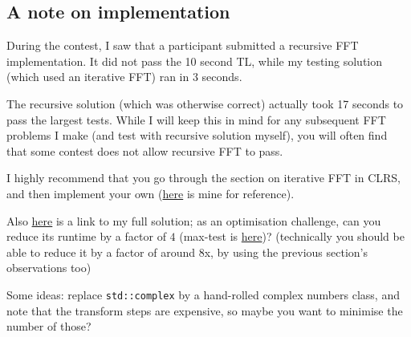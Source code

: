 	\subsection{A note on implementation}
		During the contest, I saw that a participant submitted a recursive FFT implementation.
		It did not pass the 10 second TL, while my testing solution (which used an iterative FFT)
		ran in 3 seconds.

		The recursive solution (which was otherwise correct) actually took 17 seconds to pass the
		largest tests. While I will keep this in mind for any subsequent FFT problems I make
		(and test with recursive solution myself), you will often find that some contest does not
		allow recursive FFT to pass.

		I highly recommend that you go through the section on iterative FFT in CLRS, and then implement
		your own (\href{https://github.com/parthmittal/codebook/blob/master/fastfft.cpp}{here} is mine
		for reference).

		Also \href{https://pastebin.com/Jf7H8Prp}{here} is a link to my full solution; as an optimisation challenge,
		can you reduce its runtime by a factor of $4$ (max-test is
		\href{https://drive.google.com/file/d/0B-W-TWxgtybGQzhvR0hGZUM2MU0/view?usp=sharing}{here})?
		(technically you should be able to reduce it by a factor of around 8x, by using the previous section's observations too)

		Some ideas: replace \verb|std::complex| by a hand-rolled complex numbers class, and note that the transform
		steps are expensive, so maybe you want to minimise the number of those?
